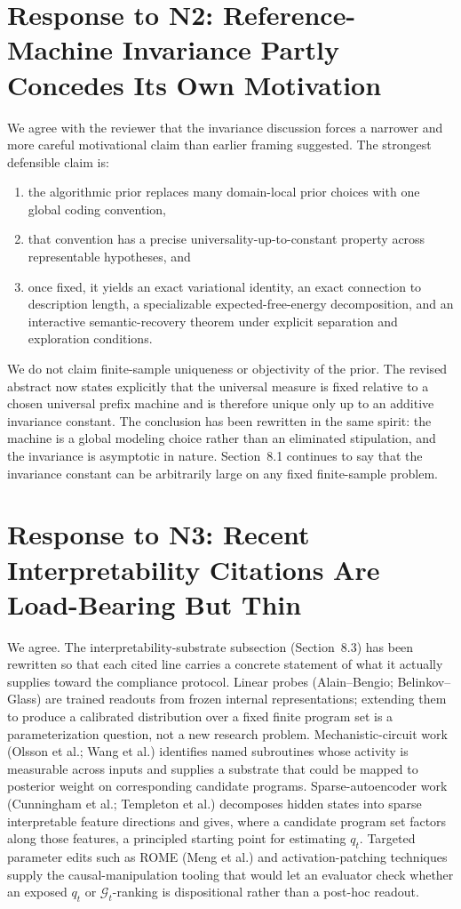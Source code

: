 \documentclass[11pt]{article}
\begin{document}
\section*{Response to N2: Reference-Machine Invariance Partly Concedes Its Own Motivation}

We agree with the reviewer that the invariance discussion forces a narrower and more careful motivational claim than earlier framing suggested. The strongest defensible claim is:
\begin{enumerate}
\item the algorithmic prior replaces many domain-local prior choices with one global coding convention,
\item that convention has a precise universality-up-to-constant property across representable hypotheses, and
\item once fixed, it yields an exact variational identity, an exact connection to description length, a specializable expected-free-energy decomposition, and an interactive semantic-recovery theorem under explicit separation and exploration conditions.
\end{enumerate}

We do not claim finite-sample uniqueness or objectivity of the prior. The revised abstract now states explicitly that the universal measure is fixed relative to a chosen universal prefix machine and is therefore unique only up to an additive invariance constant. The conclusion has been rewritten in the same spirit: the machine is a global modeling choice rather than an eliminated stipulation, and the invariance is asymptotic in nature. Section~8.1 continues to say that the invariance constant can be arbitrarily large on any fixed finite-sample problem.

\section*{Response to N3: Recent Interpretability Citations Are Load-Bearing But Thin}

We agree. The interpretability-substrate subsection (Section~8.3) has been rewritten so that each cited line carries a concrete statement of what it actually supplies toward the compliance protocol. Linear probes (Alain--Bengio; Belinkov--Glass) are trained readouts from frozen internal representations; extending them to produce a calibrated distribution over a fixed finite program set is a parameterization question, not a new research problem. Mechanistic-circuit work (Olsson et al.; Wang et al.) identifies named subroutines whose activity is measurable across inputs and supplies a substrate that could be mapped to posterior weight on corresponding candidate programs. Sparse-autoencoder work (Cunningham et al.; Templeton et al.) decomposes hidden states into sparse interpretable feature directions and gives, where a candidate program set factors along those features, a principled starting point for estimating $q_t$. Targeted parameter edits such as ROME (Meng et al.) and activation-patching techniques supply the causal-manipulation tooling that would let an evaluator check whether an exposed $q_t$ or $\mathcal{G}_t$-ranking is dispositional rather than a post-hoc readout.
\end{document}
